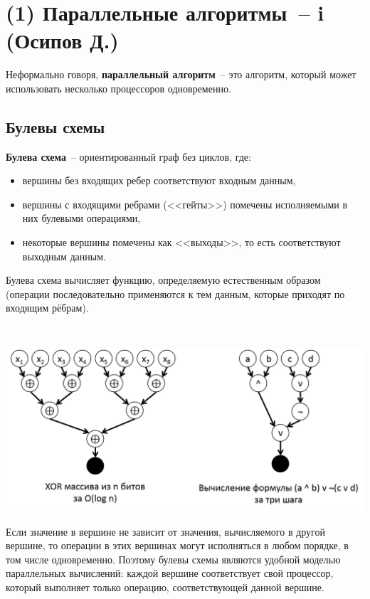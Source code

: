 \section{(1) Параллельные алгоритмы~-- i (Осипов Д.)}

Неформально говоря, {\bfseries параллельный алгоритм}~-- это алгоритм, который может использовать несколько процессоров одновременно.
\subsection{Булевы схемы}
\begin{definition*}
	{\bfseries Булева схема}~-- ориентированный граф без циклов, где:
\begin{itemize}
    \item вершины без входящих ребер соответствуют входным данным,
    \item вершины с входящими ребрами (<<гейты>>) помечены исполняемыми в них булевыми операциями, 
    \item некоторые вершины помечены как <<выходы>>, то есть соответствуют выходным данным.
\end{itemize}
Булева схема вычисляет функцию, определяемую естественным образом (операции последовательно
применяются к тем данным, которые приходят по входящим рёбрам).
\end{definition*}
\begin{example*}
$ $
    \begin{center}
    \includegraphics[scale=0.5]{figures/boolex.png}
    \end{center}
\end{example*}

Если значение в вершине не зависит от значения, вычисляемого в другой вершине, то
операции в этих вершинах могут исполняться в любом порядке, в том числе одновременно.
Поэтому булевы схемы являются удобной моделью параллельных вычислений:
каждой вершине соответствует свой процессор, который выполняет только операцию, соответствующей данной вершине.

